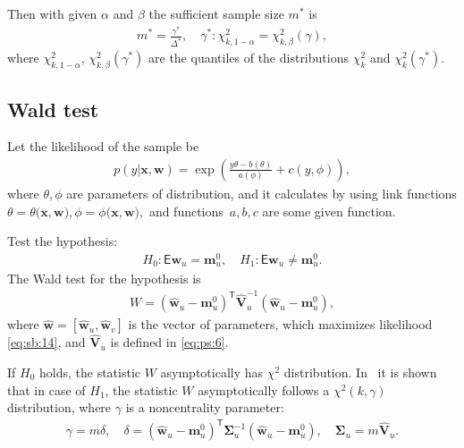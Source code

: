 \documentclass[
11pt,%
tightenlines,%
twoside,%
onecolumn,%
nofloats,%
nobibnotes,%
nofootinbib,%
superscriptaddress,%
noshowpacs,%
centertags]%
{revtex4}
\begin{document}
Then with given $\alpha$ and $\beta$ the sufficient sample size $m^*$ is
\[
\label{eq:sb:13}
\begin{aligned}
	m^* = \frac{\gamma^*}{\Delta^*}, \quad \gamma^*:\chi^2_{k, 1-\alpha} = \chi^2_{k, \beta}\left(\gamma\right), 
\end{aligned}
\]
where $\chi^2_{k, 1-\alpha}$, $\chi^2_{k, \beta}\left(\gamma^*\right)$ are the quantiles of the distributions $\chi^{2}_k$ and $\chi^2_{k}\left(\gamma^*\right)$.
	
\subsection{Wald test}
Let the likelihood of the sample be
\[
\label{eq:sb:14}
\begin{aligned}
	p(y|\mathbf{x},\textbf{w}) = \exp\left(\frac{y\theta- b(\theta)}{a(\phi)} + c\left(y, \phi\right)\right),
\end{aligned}
\]
where $\theta, \phi$ are parameters of distribution, and it calculates by using link functions $\theta=\theta\bigr(\textbf{x},\textbf{w}\bigr), \phi=\phi\bigr(\textbf{x},\textbf{w}\bigr),$ and functions~$a, b, c$ are some given function.

Test the hypothesis:
\[
\label{eq:sb:15}
\begin{aligned}
	H_0: \mathsf{E}\textbf{w}_{u} = \textbf{m}_{u}^{0}, \quad H_1: \mathsf{E}\textbf{w}_{u} \not=\textbf{m}_{u}^{0}.
\end{aligned}
\]
The Wald test for the hypothesis is
\[
\label{eq:sb:16}
\begin{aligned}
	W = \left(\hat{\textbf{w}}_{u} - \textbf{m}_{u}^{0}\right)^{\mathsf{T}}\hat{\textbf{V}}_{u}^{-1}\left(\hat{\textbf{w}}_{u} - \textbf{m}_{u}^{0}\right),
\end{aligned}
\]
where $\hat{\textbf{w}} = [\hat{\textbf{w}}_{u},\hat{\textbf{w}}_{v}]$ is the vector of parameters, which maximizes likelihood \eqref{eq:sb:14}, and $\hat{\textbf{V}}_u$ is defined in \eqref{eq:ps:6}.

If $H_0$ holds, the statistic $W$ asymptotically has $\chi^2$ distribution. In~\cite{shieh2005} it is shown that in case of $H_1$, the statistic $W$ asymptotically follows a $\chi^2(k,\gamma)$ distribution, where $\gamma$ is a noncentrality parameter:
\[
\label{eq:sb:17}
\begin{aligned}
	\gamma = m\delta, \quad \delta = \left(\hat{\textbf{w}}_{u} - \textbf{m}_{u}^{0}\right)^{\mathsf{T}}\bm{\Sigma}^{-1}_u\left(\hat{\textbf{w}}_{u} - \textbf{m}_{u}^{0}\right), \quad \bm{\Sigma}_u = m\hat{\textbf{V}}_u.
\end{aligned}
\]
\end{document}
